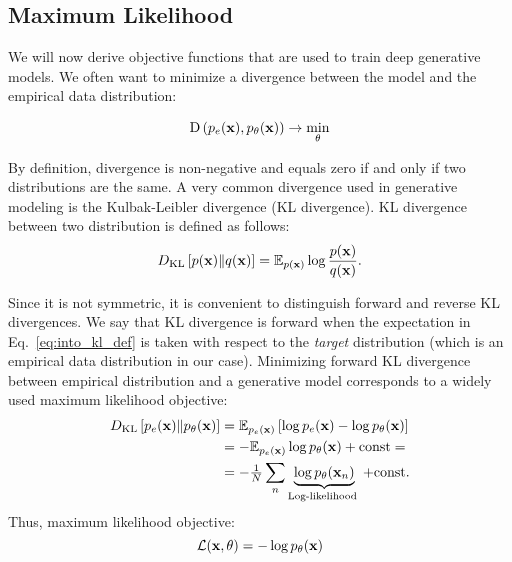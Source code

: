 \subsection{Maximum Likelihood}
We will now derive objective functions that are used to train deep generative models. We often want to minimize a divergence between the model and the empirical data distribution:

\begin{equation}\label{eq:intro_divergence}
\begin{aligned}
\text{D}\left(p_{e}(\rvx), p_{\theta}(\rvx)\right) \rightarrow \min_{\theta}
\end{aligned}
\end{equation} 

By definition, divergence is non-negative and equals zero if and only if two distributions are the same. 
A very common divergence used in generative modeling is the Kulbak-Leibler divergence (KL divergence). KL divergence between two distribution is defined as follows:
\begin{equation}
\begin{aligned} \label{eq:into_kl_def}
 \KL{p(\rvx)}{q(\rvx)} = \E_{p(\rvx)} \log \frac{p(\rvx)}{q(\rvx)}.
\end{aligned}
\end{equation}

Since it is not symmetric, it is convenient to distinguish forward and reverse KL divergences. We say that KL divergence is forward when the expectation in Eq.~\ref{eq:into_kl_def} is taken with respect to the \textit{target} distribution (which is an empirical data distribution in our case). Minimizing forward KL divergence between empirical distribution and a generative model corresponds to a widely used maximum likelihood objective:
\begin{equation}
\begin{aligned}
D_{\mathrm{KL}}\left[p_{e}({\mathbf{x}})\|p_{\theta}({\mathbf{x}})\right] & =  \mathbb{E}_{p_{e}({\mathbf{x}})}\left[ \log p_{e}({\mathbf{x}}) - \log p_{\theta}({\mathbf{x}})\right] \\
& =  - \mathbb{E}_{p_{e}({\mathbf{x}})} \log p_{\theta}({\mathbf{x}}) + \text{const}=\\
& =  - \tfrac1N \sum_n \underbrace{\log p_{\theta}({\mathbf{x}}_n)}_{\text{Log-likelihood }}  + \text{const}.
\end{aligned}
\end{equation}
Thus, maximum likelihood objective:
\begin{equation}
    \mathcal{L}({\mathbf{x}}, \theta) = -\log p_{\theta}({\mathbf{x}})
\end{equation}

